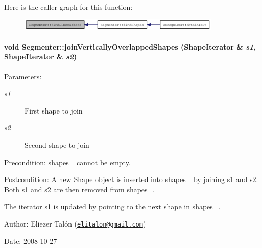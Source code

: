 Here is the caller graph for this function:\nopagebreak
\begin{figure}[H]
\begin{center}
\leavevmode
\includegraphics[width=274pt]{class_segmenter_ad8893282742e811dd7fff172ec03c85_icgraph}
\end{center}
\end{figure}
\hypertarget{class_segmenter_a6fc98922155143cf36f542118c33f3a}{
\paragraph[joinVerticallyOverlappedShapes]{\setlength{\rightskip}{0pt plus 5cm}void Segmenter::joinVerticallyOverlappedShapes ({\bf ShapeIterator} \& {\em s1}, \/  {\bf ShapeIterator} \& {\em s2})}\hfill}
\label{class_segmenter_a6fc98922155143cf36f542118c33f3a}


\begin{Desc}
\item[Parameters:]
\begin{description}
\item[{\em s1}]First shape to join \item[{\em s2}]Second shape to join\end{description}
\end{Desc}
\begin{Desc}
\item[Precondition:]\hyperlink{class_segmenter_41b94ede2829063e0937dc150756e77e}{shapes\_\-} cannot be empty.\end{Desc}
\begin{Desc}
\item[Postcondition:]A new \hyperlink{class_shape}{Shape} object is inserted into \hyperlink{class_segmenter_41b94ede2829063e0937dc150756e77e}{shapes\_\-} by joining s1 and s2. Both s1 and s2 are then removed from \hyperlink{class_segmenter_41b94ede2829063e0937dc150756e77e}{shapes\_\-}. 

The iterator s1 is updated by pointing to the next shape in \hyperlink{class_segmenter_41b94ede2829063e0937dc150756e77e}{shapes\_\-}.\end{Desc}
\begin{Desc}
\item[Author:]Eliezer Talón (\href{mailto:elitalon@gmail.com}{\tt elitalon@gmail.com}) \end{Desc}
\begin{Desc}
\item[Date:]2008-10-27 \end{Desc}


